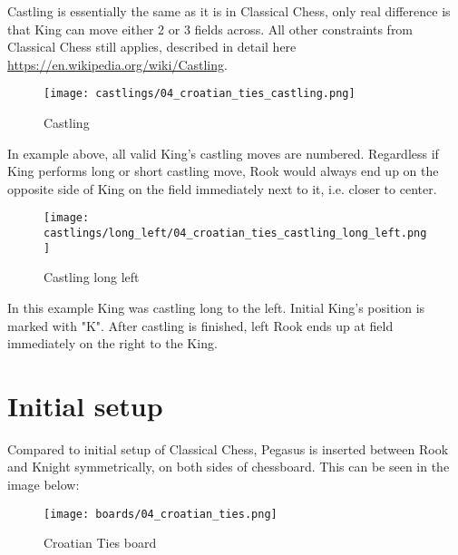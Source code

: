 Castling is essentially the same as it is in Classical Chess, only real difference is that
King can move either 2 or 3 fields across. All other constraints from Classical Chess still
applies, described in detail here \\
\href{https://en.wikipedia.org/wiki/Castling}{https://en.wikipedia.org/wiki/Castling}.

\noindent
\begin{figure}[!h]
\texttt{[image: castlings/04\_croatian\_ties\_castling.png]}
\caption{Castling}
\label{fig:04_croatian_ties_castling}
\end{figure}

In example above, all valid King's castling moves are numbered. Regardless if King performs
long or short castling move, Rook would always end up on the opposite side of King on the
field immediately next to it, i.e. closer to center.

\noindent
\begin{figure}[!h]
\texttt{[image: castlings/long\_left/04\_croatian\_ties\_castling\_long\_left.png]}
\caption{Castling long left}
\label{fig:04_croatian_ties_castling_long_left}
\end{figure}

In this example King was castling long to the left. Initial King's position is marked with "K".
After castling is finished, left Rook ends up at field immediately on the right to the King.

\clearpage %

\section*{Initial setup}

Compared to initial setup of Classical Chess, Pegasus is inserted between Rook and Knight
symmetrically, on both sides of chessboard. This can be seen in the image below:

\noindent
\begin{figure}[h]
\texttt{[image: boards/04\_croatian\_ties.png]}
\caption{Croatian Ties board}
\label{fig:04_croatian_ties}
\end{figure}

\clearpage %

